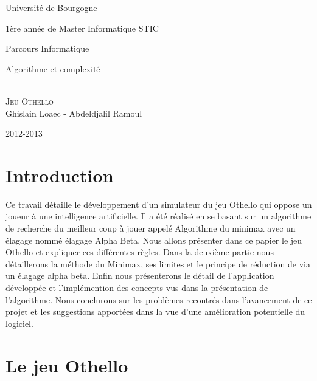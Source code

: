 \documentclass[11pt]{article}
\begin{document}
\begin{titlepage}
\begin{center}

{\Large 
    Université de Bourgogne
    
    1ère année de Master Informatique STIC
    
    Parcours Informatique
    
    Algorithme et complexité
}
\\[1.5cm]
  \textsc{\Huge Jeu Othello}
\\[1.5cm]  
  Ghislain Loaec - Abdeldjalil Ramoul
  
  2012-2013
\end{center}

\begin{abstract}
  Ce rapport présente le travaille effectué dans le cadre du projet
  d'algorithme et complexité 
\end{abstract}


\end{titlepage}

{\tableofcontents}

{\listoffigures}

{\listoftables}

{\listofalgorithms}

\section{Introduction}

Ce travail détaille le développement d'un simulateur du jeu Othello
qui oppose un joueur à une intelligence artificielle. Il a été
réalisé en se basant sur un algorithme de recherche du meilleur coup
à jouer appelé Algorithme du minimax avec un élagage nommé
élagage Alpha Beta. Nous allons présenter dans ce papier le jeu
Othello et expliquer ces différentes règles. Dans la deuxième
partie nous détaillerons la méthode du Minimax, ses limites et le
principe de réduction de via un élagage alpha beta. Enfin nous
présenterons le détail de l'application développée et
l'implémention des concepts vus dans la présentation de l'algorithme.
Nous conclurons sur les problèmes recontrés dans l'avancement de ce
projet et les suggestions apportées dans la vue d'une amélioration
potentielle du logiciel.

\section{Le jeu Othello}
\end{document}
